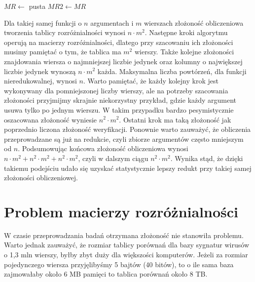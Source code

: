 \begin{algorithm}[H]
    $MR\gets$ pusta\;
    $MR2\gets MR$\;
\end{algorithm}

Dla takiej samej funkcji o $n$ argumentach i $m$ wierszach złożoność obliczeniowa tworzenia tablicy rozróżnialności wynosi $n \cdot m^2$.
Następne kroki algorytmu operują na macierzy rozróżnialności,
dlatego przy szacowaniu ich złożoności musimy pamiętać o tym,
że tablica ma $m^2$ wierszy.
Także kolejne złożoności znajdowania wiersza o najmniejszej liczbie jedynek oraz kolumny o największej liczbie jedynek wynoszą $n \cdot m^2$ każda.
Maksymalna liczba powtórzeń,
dla funkcji nieredukowalnej,
wynosi $n$.
Warto pamiętać,
że każdy kolejny krok jest wykonywany dla pomniejszonej liczby wierszy,
ale na potrzeby szacowania złożoności przyjmijmy skrajnie niekorzystny przykład,
gdzie każdy argument usuwa tylko po jednym wierszu.
W takim przypadku bardzo pesymistycznie oszacowana złożoność wyniesie $n^2 \cdot m^2$.
Ostatni krok ma taką złożoność jak poprzednio liczona złożoność weryfikacji.
Ponownie warto zauważyć,
że obliczenia przeprowadzane są już na redukcie,
czyli zbiorze argumentów często mniejszym od $n$.
Podsumowując końcowa złożoność obliczeniowa wynosi $n \cdot m^2 + n^2 \cdot m^2 + n^2 \cdot m^2$,
czyli w dalszym ciągu $n^2 \cdot m^2$.
Wynika stąd,
że dzięki takiemu podejściu udało się uzyskać statystycznie lepszy redukt przy takiej samej złożoności obliczeniowej.


\section{Problem macierzy rozróżnialności}

W czasie przeprowadzania badań otrzymana złożoność nie stanowiła problemu.
Warto jednak zauważyć,
że rozmiar tablicy porównań dla bazy sygnatur wirusów o 1,3 mln wierszy,
byłby zbyt duży dla większości komputerów.
Jeżeli za rozmiar pojedynczego wiersza przyjęlibyśmy 5 bajtów (40 bitów), to o ile sama baza zajmowałaby około 6 MB pamięci to tablica porównań około 8 TB.


